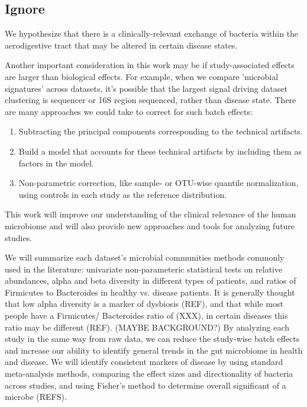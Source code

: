\documentclass[12pt]{article}
\begin{document}
\subsection{Ignore}
We hypothesize that there is a clinically-relevant exchange of bacteria within the aerodigestive tract that may be altered in certain disease states. 


Another important consideration in this work may be if study-associated effects are larger than biological effects. For example, when we compare 'microbial signatures' across datasets, it's possible that the largest signal driving dataset clustering is sequencer or 16S region sequenced, rather than disease state. There are many approaches we could take to correct for such batch effects:
\begin{enumerate}
	\item Subtracting the principal components corresponding to the technical artifacts.
	\item Build a model that accounts for these technical artifacts by including them as factors in the model.
	\item Non-parametric correction, like sample- or OTU-wise quantile normalization, using controls in each study as the reference distribution.
\end{enumerate}

This work will improve our 
understanding of the clinical relevance of the human microbiome and 
will also provide new approaches and tools for analyzing future 
studies.

We will summarize each dataset's microbial communities
methods commonly used in the 
literature: univariate non-parameteric statistical tests on relative 
abundances, alpha and beta diversity in different types of patients, 
and ratios of Firmicutes to Bacteroides in healthy vs. disease 
patients. It is generally thought that low alpha diversity is a marker 
of dysbiosis (REF), and that while most people have a Firmicutes/
Bacteroides ratio of (XXX), in certain diseases this ratio may be 
different (REF). (MAYBE BACKGROUND?) By analyzing each study in the 
same way from raw data, we can reduce the study-wise batch effects and 
increase our ability to identify general trends in the gut microbiome 
in health and disease. We will identify consistent markers of disease 
by using standard meta-analysis methods, comparing the effect sizes 
and directionality of bacteria across studies, and using Fisher's 
method to determine overall significant of a microbe (REFS). 
\end{document}
